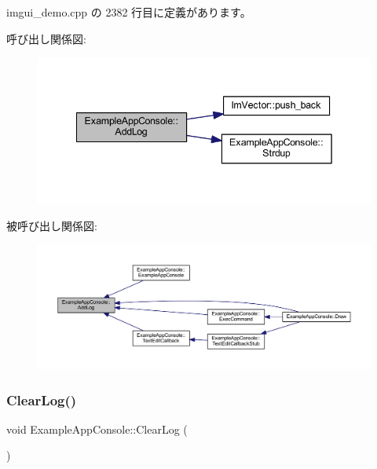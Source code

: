  imgui\+\_\+demo.\+cpp の 2382 行目に定義があります。

呼び出し関係図\+:\nopagebreak
\begin{figure}[H]
\begin{center}
\leavevmode
\includegraphics[width=342pt]{struct_example_app_console_a719354ce6be7481923a5fd702e785952_cgraph}
\end{center}
\end{figure}
被呼び出し関係図\+:\nopagebreak
\begin{figure}[H]
\begin{center}
\leavevmode
\includegraphics[width=350pt]{struct_example_app_console_a719354ce6be7481923a5fd702e785952_icgraph}
\end{center}
\end{figure}
\mbox{\label{struct_example_app_console_a2ef13f00c474b16b8da2ec062d5e5cc2}} 
\subsubsection{\texorpdfstring{Clear\+Log()}{ClearLog()}}
{\footnotesize\ttfamily void Example\+App\+Console\+::\+Clear\+Log (\begin{DoxyParamCaption}{ }\end{DoxyParamCaption})\hspace{0.3cm}{\ttfamily [inline]}}



